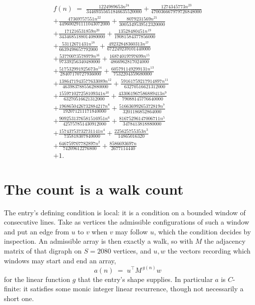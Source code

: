 \documentclass[11pt,a4paper]{article}
\theoremstyle{plain}
\theoremstyle{definition}
\begin{document}
\begin{multline*}
f(n)\;=\;\frac{1224989653 n^{24}}{34469355651846635520000} + \frac{1274345773 n^{23}}{470036667979726848000} \\
+ \frac{47369757551 n^{22}}{449600291111043072000} + \frac{8079231569 n^{21}}{3005349539512320000} \\
+ \frac{171216531859 n^{20}}{3434685188014080000} + \frac{13528480451 n^{19}}{19081584377856000} \\
+ \frac{53112671431 n^{18}}{6639498657792000} + \frac{49232848360313 n^{17}}{672249239101440000} \\
+ \frac{53770073578979 n^{16}}{97339256340480000} + \frac{16874019797699 n^{15}}{4866962817024000} \\
+ \frac{517532991925673 n^{14}}{28407170727936000} + \frac{605791149299131 n^{13}}{7532204359680000} \\
+ \frac{1386471943577633089 n^{12}}{4639837885562880000} + \frac{59161759217914897 n^{11}}{63270516621312000} \\
+ \frac{155971027258109341 n^{10}}{63270516621312000} + \frac{433061967586889413 n^{9}}{79088145776640000} \\
+ \frac{1968650426732884217 n^{8}}{192071211171840000} + \frac{51663699265372819 n^{7}}{3201186852864000} \\
+ \frac{9092531376581516951 n^{6}}{425757851430912000} + \frac{81675296147006711 n^{5}}{3478413818880000} \\
+ \frac{15743753732731141 n^{4}}{735818307840000} + \frac{225625755353 n^{3}}{14865016320} \\
+ \frac{646759707782897 n^{2}}{74209612276800} + \frac{8586693697 n}{2677114440} \\
+ 1.
\end{multline*}

\section{The count is a walk count}

The entry's defining condition is local: it is a condition on a bounded window of consecutive lines. Take as vertices the
admissible configurations of such a window and put an edge from $u$ to $v$ when $v$ may
follow $u$, which the condition decides by inspection. An admissible array is then exactly a
walk, so with $M$ the adjacency matrix of that digraph on $S=2080$ vertices, and $u,w$ the
vectors recording which windows may start and end an array,
\[
a(n)\;=\;u^{\!\top}M^{\,g(n)}w
\]
for the linear function $g$ that the entry's shape supplies. In particular $a$ is
$C$-finite: it satisfies some monic integer linear recurrence, though not necessarily a short
one.
\end{document}
